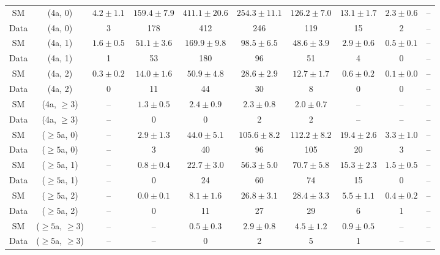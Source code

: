 \begin{table}[h!]
{\begin{tabular}{cccccccccc}
	SM & (4a, 0) & $4.2\pm 1.1$ & $159.4\pm 7.9$ & $411.1\pm 20.6$ & $254.3\pm 11.1$ & $126.2\pm 7.0$ & $13.1\pm 1.7$ & $2.3\pm 0.6$ & -- \\[0.5ex] 
	Data & (4a, 0) & 3 & 178 & 412 & 246 & 119 & 15 & 2 & -- \\[0.5ex] 
	SM & (4a, 1) & $1.6\pm 0.5$ & $51.1\pm 3.6$ & $169.9\pm 9.8$ & $98.5\pm 6.5$ & $48.6\pm 3.9$ & $2.9\pm 0.6$ & $0.5\pm 0.1$ & -- \\[0.5ex] 
	Data & (4a, 1) & 1 & 53 & 180 & 96 & 51 & 4 & 0 & -- \\[0.5ex] 
	SM & (4a, 2) & $0.3\pm 0.2$ & $14.0\pm 1.6$ & $50.9\pm 4.8$ & $28.6\pm 2.9$ & $12.7\pm 1.7$ & $0.6\pm 0.2$ & $0.1\pm 0.0$ & -- \\[0.5ex] 
	Data & (4a, 2) & 0 & 11 & 44 & 30 & 8 & 0 & 0 & -- \\[0.5ex] 
	SM & (4a, $\ge3$) & -- & $1.3\pm 0.5$ & $2.4\pm 0.9$ & $2.3\pm 0.8$ & $2.0\pm 0.7$ & -- & -- & -- \\[0.5ex] 
	Data & (4a, $\ge3$) & -- & 0 & 0 & 2 & 2 & -- & -- & -- \\[0.5ex] 
	SM & ($\ge5$a, 0) & -- & $2.9\pm 1.3$ & $44.0\pm 5.1$ & $105.6\pm 8.2$ & $112.2\pm 8.2$ & $19.4\pm 2.6$ & $3.3\pm 1.0$ & -- \\[0.5ex] 
	Data & ($\ge5$a, 0) & -- & 3 & 40 & 96 & 105 & 20 & 3 & -- \\[0.5ex] 
	SM & ($\ge5$a, 1) & -- & $0.8\pm 0.4$ & $22.7\pm 3.0$ & $56.3\pm 5.0$ & $70.7\pm 5.8$ & $15.3\pm 2.3$ & $1.5\pm 0.5$ & -- \\[0.5ex] 
	Data & ($\ge5$a, 1) & -- & 0 & 24 & 60 & 74 & 15 & 0 & -- \\[0.5ex] 
	SM & ($\ge5$a, 2) & -- & $0.0\pm 0.1$ & $8.1\pm 1.6$ & $26.8\pm 3.1$ & $28.4\pm 3.3$ & $5.5\pm 1.1$ & $0.4\pm 0.2$ & -- \\[0.5ex] 
	Data & ($\ge5$a, 2) & -- & 0 & 11 & 27 & 29 & 6 & 1 & -- \\[0.5ex] 
	SM & ($\ge5$a, $\ge3$) & -- & -- & $0.5\pm 0.3$ & $2.9\pm 0.8$ & $4.5\pm 1.2$ & $0.9\pm 0.5$ & -- & -- \\[0.5ex] 
	Data & ($\ge5$a, $\ge3$) & -- & -- & 0 & 2 & 5 & 1 & -- & -- \\[0.5ex] 
	\hline
	\hline
\end{tabular}}
\end{table}
